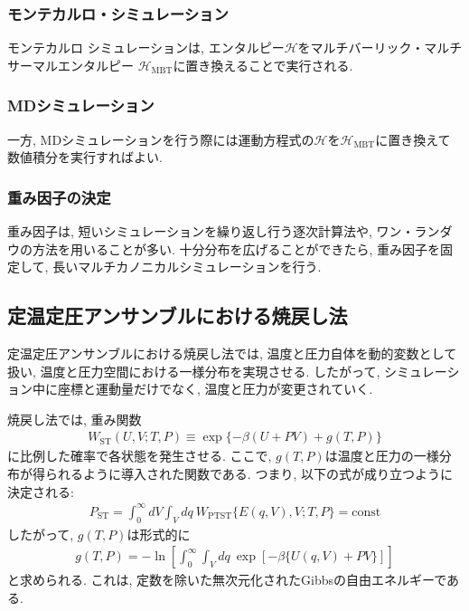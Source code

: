 \subsubsection{モンテカルロ・シミュレーション}
モンテカルロ シミュレーションは, エンタルピー$\mathcal{H}$をマルチバーリック・マルチサーマルエンタルピー
$\mathcal{H}_{\mathrm{MBT}}$に置き換えることで実行される.
\subsubsection{MDシミュレーション}
一方, MDシミュレーションを行う際には運動方程式の$\mathcal{H}$を$\mathcal{H}_{\mathrm{MBT}}$に置き換えて
数値積分を実行すればよい.
\subsubsection{重み因子の決定}
重み因子は, 短いシミュレーションを繰り返し行う逐次計算法や, ワン・ランダウの方法を用いることが多い. 十分分布を広げることができたら, 重み因子を固定して, 長いマルチカノニカルシミュレーションを行う.


\subsection{定温定圧アンサンブルにおける焼戻し法}
定温定圧アンサンブルにおける焼戻し法では, 温度と圧力自体を動的変数として扱い,
温度と圧力空間における一様分布を実現させる.
したがって, シミュレーション中に座標と運動量だけでなく, 温度と圧力が変更されていく.

焼戻し法では, 重み関数
\begin{align}
 W_{\mathrm{ST}} (U, V; T, P)
 \equiv
 \exp \{ -\beta (U +PV) + g(T,P) \}
\end{align}
に比例した確率で各状態を発生させる.
ここで, $g(T,P)$は温度と圧力の一様分布が得られるように導入された関数である.
つまり, 以下の式が成り立つように決定される:
\begin{align}
 P_{\mathrm{ST}}
 =
 \int_{0}^{\infty} dV
 \int_{V} dq~
 W_{\mathrm{PTST}} \{ E(q,V), V; T, P \}
 =
 \mathrm{const}
\end{align}
したがって, $g(T,P)$は形式的に
\begin{align}
 g(T,P)
 =
 - \ln \left[ \int_{0}^{\infty} \int_{V} dq~
              \exp [ -\beta \{ U(q,V) + PV \} ]
       \right]
\end{align}
と求められる.
これは, 定数を除いた無次元化されたGibbsの自由エネルギーである.


